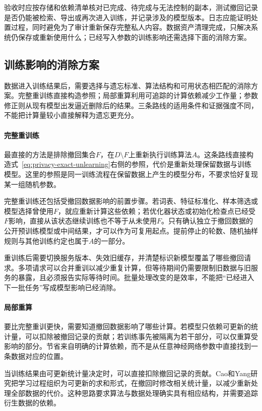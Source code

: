验收时应按存储和依赖清单核对已完成、待完成与无法控制的副本，测试撤回记录是否仍能被检索、导出或再次进入训练，并记录涉及的模型版本。日志应能证明处置过程，同时避免为了审计重新保存完整私人内容。数据资产清理完成，只解决系统仍保存或重新使用什么；已经写入参数的训练影响还需选择下面的消除方案。

\subsection{训练影响的消除方案}
\label{sec:privacy-unlearning-methods}

数据进入训练结果后，需要选择与遗忘标准、算法结构和可用状态相匹配的消除方案。完整重训练直接构造参照；局部重算利用可追踪的计算依赖减少工作量；参数修正则从现有模型出发逼近删除后的结果。三条路线的适用条件和证据强度不同，不能把计算量较小直接解释为遗忘更充分。

\paragraph{完整重训练}

最直接的方法是排除撤回集合$F$，在$D\setminus F$上重新执行训练算法$A$。这条路线直接构造式~\eqref{eq:privacy-exact-unlearning}右侧的参照，代价是重新处理保留数据与训练模型。这里的参照是同一训练流程在保留数据上产生的模型分布，不要求恰好复现某一组随机参数。

完整重训练还包括受撤回数据影响的前置步骤。若词表、特征标准化、样本筛选或模型选择曾使用$F$，就应重新计算这些依赖；若优化器状态或初始化检查点已经受$F$影响，直接从该状态继续训练也不等于从未使用$F$。只有确认独立于撤回数据的公开预训练模型或中间结果，才可以作为可复用起点。提前停止的轮数、随机抽样规则与其他训练约定也属于$A$的一部分。

重训练后需要切换服务版本、失效旧缓存，并清楚标识新模型覆盖了哪些撤回请求。多项请求可以合并重训以减少重复计算，但等待期间仍需要限制旧数据与旧服务的暴露，且必须报告实际等待时间。批量处理改变的是效率，不能把“已经进入下一批任务”写成模型影响已经消除。

\paragraph{局部重算}

要比完整重训更快，需要知道撤回数据影响了哪些计算。若模型只依赖可更新的统计量，可以扣除被撤回记录的贡献；若训练事先被隔离为若干部分，可以仅重算受影响的部分。节省来自明确的计算依赖，而不是从任意神经网络参数中直接找到一条数据对应的位置。

当训练结果由可更新统计量决定时，可以直接扣除撤回记录的贡献。Cao和Yang研究把学习过程组织为可更新的求和形式，在撤回时修改相关统计量，以减少重新处理全部数据的代价。这种思路要求算法与数据处理确实具有相应结构，并需要追踪衍生数据的依赖。

